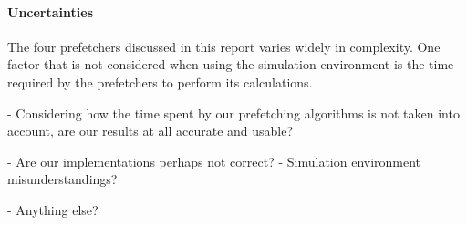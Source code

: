 \paragraph{Uncertainties}
\label{"waiting for reftex-label call..."}
The four prefetchers discussed in this report varies widely in complexity. One factor that is not considered when using the simulation environment is the time required by the prefetchers to perform its calculations. 

- Considering how the time spent by our prefetching algorithms is not
taken into account, are our results at all accurate and usable?

- Are our implementations perhaps not correct?
- Simulation environment misunderstandings?

- Anything else?
